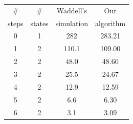 \documentclass[a0paper,landscape]{baposter}
\begin{document}
\begin{poster}
{\begin{figure}
\begin{tabular}{|cc|c|c|}
\hline
\# & \#  & Waddell's  & Our \\
 steps & states & simulation &  algorithm\\
\hline
0 & 1 & 282 & 283.21\\
1 & 2 & 110.1 & 109.00\\
2 & 2 & 48.0 & 48.60\\
3 & 2 & 25.5 & 24.67\\
4 & 2 & 12.9 & 12.59\\
5 & 2 & 6.6 & 6.30\\
6 & 2 & 3.1 & 3.09\\
\hline
\end{tabular}
\end{figure}


}
\end{poster}
\end{document}

